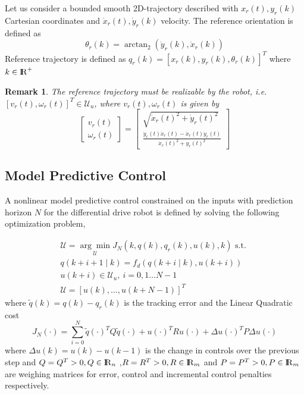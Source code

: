 \documentclass[letterpaper, 10 pt, conference]{ieeeconf}
\newtheorem{remark}{\textbf{Remark}}
\newcommand{\rr}{\mathop{{\rm I}\mskip-4.0mu{\rm R}}\nolimits}
\begin{document}
Let us consider a bounded smooth 2D-trajectory described with $x_r(t), y_r(k)$ Cartesian coordinates and $\dot{x}_r(t), \dot{y}_r(k)$ velocity.  The reference orientation is defined as
\begin{equation}\label{eq:thetar}
  \theta_r(k) = \arctan_2(\dot{y}_r(k),\dot{x}_r(k))
\end{equation}
Reference trajectory is defined as $q_r(k) = [x_r(k), y_r(k),\theta_r(k)]^T$ where $k\in\rr^+$
\begin{remark}
  The reference trajectory must be realizable by the robot, i.e. $[v_r(t),\omega_r(t)]^T\in\mathcal{U}_u$, where $v_r(t),\omega_r(t)$ is given by
  \begin{equation}
    \left[
      \begin{array}{c}
        v_r(t) \\
        \omega_r(t)
    \end{array}\right]=\left[
      \begin{array}{c}
        \sqrt{\dot{x}_r(t)^2+\dot{y}_r(t)^2} \\
        \frac{\dot{y}_r(t) \dot{x}_r(t)-\ddot{x}_r(t) \dot{y}_r(t)}{\dot{x}_r(t)^2+y_r(t)^2}
    \end{array}\right]
  \end{equation}
\end{remark}
%
\subsection{Model Predictive Control}\label{sec:MPC}
A nonlinear model predictive control constrained on the inputs with prediction horizon $N$ for the differential drive robot is defined by solving the following optimization problem,

\begin{equation}\label{eq:NMPC_op}
  \begin{gathered}
    \mathcal{U} = \underset{\mathcal{U}} {\arg \min } J_N(k, q(k), q_r(k), u(k), k) \text { s.t. } \\
    q(k+i+1 \mid k)=f_d(q(k+i \mid k), u(k+i)) \\
    u(k+i) \in \mathcal{U}_u , \ i=0,1 \ldots N-1\\
    \mathcal{U} = [u(k),\dots, u(k+N-1)]^T
  \end{gathered}
\end{equation}
where  $\tilde{q}(k) = q(k)-q_r(k)$ is the tracking error and the Linear Quadratic cost
\begin{equation}
  J_N(\cdot)=\sum_{i=0}^{N} \!\tilde{q}(\cdot)^TQ \tilde{q}(\cdot)\!+\! u(\cdot)^TRu(\cdot)+ \Delta{u}(\cdot)^TP\Delta{u}(\cdot)
\end{equation}
where $\Delta{u}(k)=u(k)-u(k-1)$ is the change in controls over the previous step and $Q = Q^T>0, Q \in \rr_n$ ,$R = R^T >0, R \in \rr_m$ and $P= P^T >0, P \in \rr_m$ are weighing matrices for error, control and incremental control penalties respectively.
\end{document}
